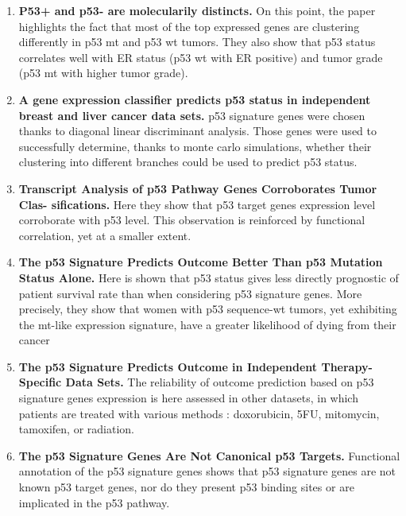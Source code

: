 \documentclass{article}
\begin{document}
\begin{enumerate}
	\item {\bf P53+ and p53- are molecularily distincts.}
On this point, the paper highlights the fact that most of the top expressed genes are clustering differently in p53 mt and p53 wt tumors.
They also show that p53 status correlates well with ER status (p53 wt with ER positive) and tumor grade (p53 mt with higher tumor grade).
	\item {\bf A gene expression classifier predicts p53 status in independent breast and liver cancer data sets.}
p53 signature genes were chosen thanks to diagonal linear discriminant analysis. Those genes were used to successfully determine, thanks to monte carlo simulations, whether their clustering into different branches could be used to predict p53 status.
	\item {\bf Transcript Analysis of p53 Pathway Genes Corroborates Tumor Clas- sifications.}
Here they show that p53 target genes expression level corroborate with p53 level. This observation is reinforced by functional correlation, yet at a smaller extent.
	\item {\bf The p53 Signature Predicts Outcome Better Than p53 Mutation Status Alone.}
Here is shown that p53 status gives less directly prognostic of patient survival rate than when considering p53 signature genes. More precisely, they show that women with p53 sequence-wt tumors, yet exhibiting the mt-like expression signature, have a greater likelihood of dying from their cancer
	\item {\bf The p53 Signature Predicts Outcome in Independent Therapy-Specific Data Sets.}
The reliability of outcome prediction based on p53 signature genes expression is here assessed in other datasets, in which patients are treated with various methods : doxorubicin, 5FU, mitomycin, tamoxifen, or radiation.
	\item {\bf The p53 Signature Genes Are Not Canonical p53 Targets.}
Functional annotation of the p53 signature genes shows that p53 signature genes are not known p53 target genes, nor do they present p53 binding sites or are implicated in the p53 pathway.
\end{enumerate}
\newpage
\end{document}
